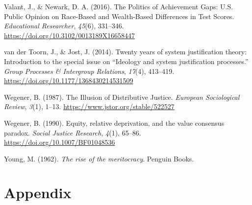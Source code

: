 \documentclass[
  12pt,
  a4paper,
]{article}
\newlength{\cslhangindent}
\newenvironment{CSLReferences}[2] %
 {%
  \setlength{\parindent}{0pt}
  \ifodd #1 \everypar{\setlength{\hangindent}{\cslhangindent}}\ignorespaces\fi
  \ifnum #2 > 0
  \setlength{\parskip}{#2\baselineskip}
  \fi
 }%
 {}
\begin{document}
\begin{CSLReferences}{1}{0}
Valant, J., \& Newark, D. A. (2016). The {Politics} of {Achievement Gaps}: {U}.{S}. {Public Opinion} on {Race-Based} and {Wealth-Based Differences} in {Test Scores}. \emph{Educational Researcher}, \emph{45}(6), 331--346. \url{https://doi.org/10.3102/0013189X16658447}

van der Toorn, J., \& Jost, J. (2014). Twenty years of system justification theory: {Introduction} to the special issue on {``{Ideology} and system justification processes.''} \emph{Group Processes \& Intergroup Relations}, \emph{17}(4), 413--419. \url{https://doi.org/10.1177/1368430214531509}

Wegener, B. (1987). The {Illusion} of {Distributive Justice}. \emph{European Sociological Review}, \emph{3}(1), 1--13. \url{https://www.jstor.org/stable/522527}

Wegener, B. (1990). Equity, relative deprivation, and the value consensus paradox. \emph{Social Justice Research}, \emph{4}(1), 65--86. \url{https://doi.org/10.1007/BF01048536}

Young, M. (1962). \emph{The rise of the meritocracy}. Penguin Books.

\end{CSLReferences}

\newpage

\appendix


\appendix \section{Appendix}
\end{document}
